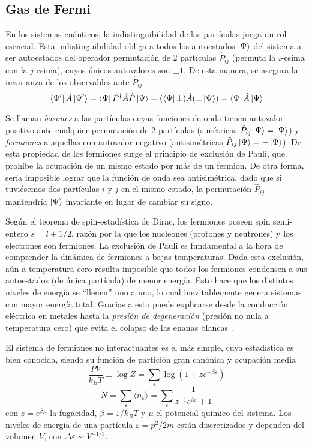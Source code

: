 \subsection{Gas de Fermi}{\label{sec:intro_fermi_gas}}

En los sistemas cuánticos, la indistinguibilidad de las partículas juega un rol esencial.
Esta indistinguibilidad obliga a todos los autoestados $\ket{\Psi}$ del sistema a ser autoestados del operador permutación de 2 partículas $\hat{P}_{ij}$ (permuta la $i$-esima con la $j$-esima), cuyos únicos autovalores son $\pm 1$.
De esta manera, se asegura la invarianza de los observables ante $\hat{P}_{ij}$
\[\bra{\Psi'}\hat{A}\ket{\Psi'} = \bra{\Psi}\hat{P}^\dagger\hat{A}\hat{P}\ket{\Psi} = (\bra{\Psi}\pm)\hat{A}(\pm\ket{\Psi}) = \bra{\Psi}\hat{A}\ket{\Psi}\]

Se llaman \textit{bosones} a las partículas cuyas funciones de onda tienen autovalor positivo ante cualquier permutación de 2 partículas (simétricas $\hat{P}_{ij}\ket{\Psi} = \ket{\Psi}$) y \textit{fermiones} a aquellas con autovalor negativo (antisimétricas $\hat{P}_{ij}\ket{\Psi} = -\ket{\Psi}$).
De esta propiedad de los fermiones surge el principio de exclusión de Pauli, que prohíbe la ocupación de un mismo estado por más de un fermion.
De otra forma, sería imposible lograr que la función de onda sea antisimétrica, dado que si tuviésemos dos partículas $i$ y $j$ en el mismo estado, la permutación $\hat{P}_{ij}$ mantendría
$\ket{\Psi}$ invariante en lugar de cambiar su signo.

Según el teorema de spin-estadística de Dirac, los fermiones poseen spin semi-entero $s=l+1/2$, razón por la que los nucleones (protones y neutrones) y los electrones son fermiones.
La exclusión de Pauli es fundamental a la hora de comprender la dinámica de fermiones a bajas temperaturas.
Dada esta exclusión, aún a temperatura cero resulta imposible que todos los fermiones condensen a sus autoestados (de única partícula) de menor energía. 
Esto hace que los distintos niveles de energía se ``llenen'' uno a uno, lo cual inevitablemente genera sistemas con mayor energía total.
Gracias a esto puede explicarse desde la conducción eléctrica en metales\cite[pp. 247]{BOOK:PATHRIA} hasta la \textit{presión de degeneración} 
(presión no nula a temperatura cero) que evita el colapso de las enanas blancas \cite[pp. 259]{BOOK:PATHRIA}.

El sistema de fermiones no interactuantes es el más simple, cuya estadística es bien conocida, siendo su función de partición gran canónica y ocupación media\cite[pp. 231]{BOOK:PATHRIA}
\begin{equation}
 \frac{PV}{k_BT} \equiv \log Z = \sum_\varepsilon \log(1+ze^{-\beta\varepsilon})
\end{equation}
\begin{equation}
 N = \sum_\varepsilon \langle n_\varepsilon\rangle = \sum_\varepsilon \frac{1}{z^{-1}e^{\beta\varepsilon}+1}
\end{equation}
con $z=e^{\beta\mu}$ la fugacidad, $\beta=1/k_BT$ y $\mu$ el potencial químico del sistema.
Los niveles de energía de una partícula $\varepsilon=p^2/2m$ están discretizados y dependen del volumen $V$, con $\Delta\varepsilon\sim V^{-1/3}$.

